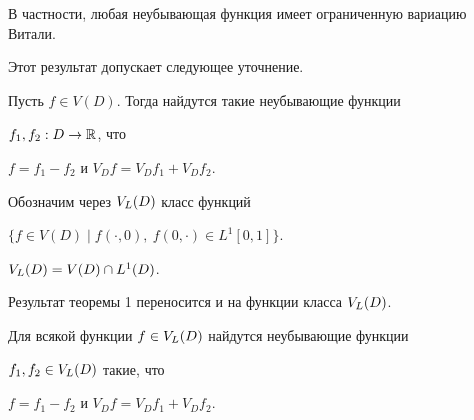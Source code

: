 В частности, любая неубывающая функция имеет ограниченную вариацию Витали.


Этот результат допускает следующее уточнение.





\begin{thm}


Пусть $f\in V(D)$. Тогда найдутся такие неубывающие функции


$f_1, f_2: D\to{\Bbb R}$, что


$f=f_1-f_2$ и $V_D f = V_D f_1 + V_D f_2$.


\end{thm}





Обозначим через $V_L(D)$ класс функций


$\{ f\in V(D) \mid f(\cdot, 0),\ f(0, \cdot) \in L^1[0,1]\}$.





\begin{lem}


$V_L(D)=V(D)\cap L^1(D)$.


\end{lem}





Результат теоремы 1 переносится и на функции класса $V_L(D)$.





\begin{thm}


Для всякой функции $f\in V_L(D)$ найдутся неубывающие функции


$f_1, f_2\in V_L(D)$ такие, что


$f=f_1-f_2$ и $V_D f = V_D f_1 + V_D f_2$.


\end{thm}





